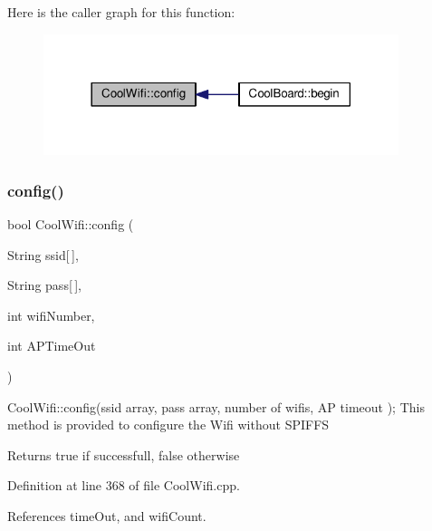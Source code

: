 Here is the caller graph for this function\+:\nopagebreak
\begin{figure}[H]
\begin{center}
\leavevmode
\includegraphics[width=294pt]{classCoolWifi_a4eb2f6b9b09dd588964b88b6c70122c0_icgraph}
\end{center}
\end{figure}
\mbox{\label{classCoolWifi_a871d4a0d9978f17fdf6d874fc2958b6c}} 
\subsubsection{\texorpdfstring{config()}{config()}\hspace{0.1cm}{\footnotesize\ttfamily [2/2]}}
{\footnotesize\ttfamily bool Cool\+Wifi\+::config (\begin{DoxyParamCaption}\item[{String}]{ssid\mbox{[}$\,$\mbox{]},  }\item[{String}]{pass\mbox{[}$\,$\mbox{]},  }\item[{int}]{wifi\+Number,  }\item[{int}]{A\+P\+Time\+Out }\end{DoxyParamCaption})}

Cool\+Wifi\+::config(ssid array, pass array, number of wifis, A\+P timeout ); This method is provided to configure the Wifi without S\+P\+I\+F\+FS

\begin{DoxyReturn}{Returns}
true if successfull, false otherwise 
\end{DoxyReturn}


Definition at line 368 of file Cool\+Wifi.\+cpp.



References time\+Out, and wifi\+Count.


